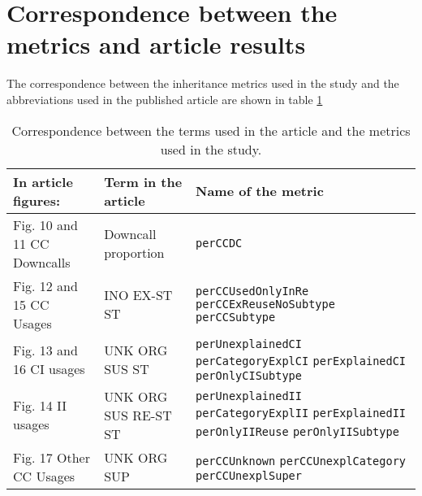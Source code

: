 \documentclass{uvamscse}
\begin{document}
\section{Correspondence between the metrics and article results} \label{Correspondence}
The correspondence between the inheritance metrics used in the study and the abbreviations used in the published article are shown in table \ref{table:CorrespondenceT} 
\begin{table} [h!]
\begin{flushleft}
\begin{tabular}[t]{| p{40mm} | p{50mm} | p{50mm} | }
  \hline
  In article figures: &  Term in the article & Name of the metric \\
  \hline
  \hline
  Fig. 10 and 11 \newline CC Downcalls & Downcall proportion  &  \texttt{perCCDC} \\
  \hline  
  Fig. 12 and 15 \newline CC Usages & INO \newline EX-ST \newline ST & \texttt{perCCUsedOnlyInRe} \newline \texttt{perCCExReuseNoSubtype} \newline \texttt{perCCSubtype} \\
  \hline 
  Fig. 13 and 16 \newline CI usages & UNK \newline ORG \newline SUS \newline ST & \texttt{perUnexplainedCI} \newline  \texttt{perCategoryExplCI} \newline  \texttt{perExplainedCI} \newline  \texttt{perOnlyCISubtype}\\ 
  \hline
  Fig. 14 \newline II usages & UNK \newline ORG \newline SUS \newline RE-ST \newline ST & \texttt{perUnexplainedII} \newline  \texttt{perCategoryExplII} \newline  \texttt{perExplainedII} \newline  \texttt{perOnlyIIReuse} \newline
  \texttt{perOnlyIISubtype} \\ 
  \hline
  Fig. 17 \newline Other CC Usages & UNK \newline ORG \newline SUP & \texttt{perCCUnknown} \newline \texttt{perCCUnexplCategory} \newline \texttt{perCCUnexplSuper} \\
  \hline 
\end{tabular}
\end{flushleft}
\caption{Correspondence between the terms used in the article and the metrics used in the study.}
\label{table:CorrespondenceT}
\end{table}
\end{document}
